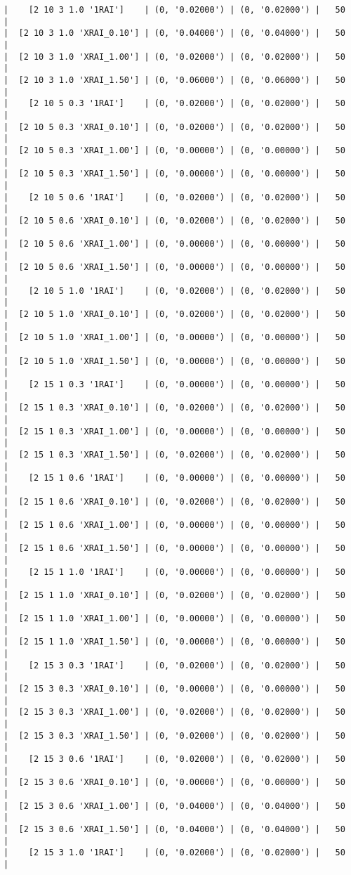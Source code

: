 \documentclass{article}
\begin{document}
\begin{verbatim}
|    [2 10 3 1.0 '1RAI']    | (0, '0.02000') | (0, '0.02000') |   50  |
|  [2 10 3 1.0 'XRAI_0.10'] | (0, '0.04000') | (0, '0.04000') |   50  |
|  [2 10 3 1.0 'XRAI_1.00'] | (0, '0.02000') | (0, '0.02000') |   50  |
|  [2 10 3 1.0 'XRAI_1.50'] | (0, '0.06000') | (0, '0.06000') |   50  |
|    [2 10 5 0.3 '1RAI']    | (0, '0.02000') | (0, '0.02000') |   50  |
|  [2 10 5 0.3 'XRAI_0.10'] | (0, '0.02000') | (0, '0.02000') |   50  |
|  [2 10 5 0.3 'XRAI_1.00'] | (0, '0.00000') | (0, '0.00000') |   50  |
|  [2 10 5 0.3 'XRAI_1.50'] | (0, '0.00000') | (0, '0.00000') |   50  |
|    [2 10 5 0.6 '1RAI']    | (0, '0.02000') | (0, '0.02000') |   50  |
|  [2 10 5 0.6 'XRAI_0.10'] | (0, '0.02000') | (0, '0.02000') |   50  |
|  [2 10 5 0.6 'XRAI_1.00'] | (0, '0.00000') | (0, '0.00000') |   50  |
|  [2 10 5 0.6 'XRAI_1.50'] | (0, '0.00000') | (0, '0.00000') |   50  |
|    [2 10 5 1.0 '1RAI']    | (0, '0.02000') | (0, '0.02000') |   50  |
|  [2 10 5 1.0 'XRAI_0.10'] | (0, '0.02000') | (0, '0.02000') |   50  |
|  [2 10 5 1.0 'XRAI_1.00'] | (0, '0.00000') | (0, '0.00000') |   50  |
|  [2 10 5 1.0 'XRAI_1.50'] | (0, '0.00000') | (0, '0.00000') |   50  |
|    [2 15 1 0.3 '1RAI']    | (0, '0.00000') | (0, '0.00000') |   50  |
|  [2 15 1 0.3 'XRAI_0.10'] | (0, '0.02000') | (0, '0.02000') |   50  |
|  [2 15 1 0.3 'XRAI_1.00'] | (0, '0.00000') | (0, '0.00000') |   50  |
|  [2 15 1 0.3 'XRAI_1.50'] | (0, '0.02000') | (0, '0.02000') |   50  |
|    [2 15 1 0.6 '1RAI']    | (0, '0.00000') | (0, '0.00000') |   50  |
|  [2 15 1 0.6 'XRAI_0.10'] | (0, '0.02000') | (0, '0.02000') |   50  |
|  [2 15 1 0.6 'XRAI_1.00'] | (0, '0.00000') | (0, '0.00000') |   50  |
|  [2 15 1 0.6 'XRAI_1.50'] | (0, '0.00000') | (0, '0.00000') |   50  |
|    [2 15 1 1.0 '1RAI']    | (0, '0.00000') | (0, '0.00000') |   50  |
|  [2 15 1 1.0 'XRAI_0.10'] | (0, '0.02000') | (0, '0.02000') |   50  |
|  [2 15 1 1.0 'XRAI_1.00'] | (0, '0.00000') | (0, '0.00000') |   50  |
|  [2 15 1 1.0 'XRAI_1.50'] | (0, '0.00000') | (0, '0.00000') |   50  |
|    [2 15 3 0.3 '1RAI']    | (0, '0.02000') | (0, '0.02000') |   50  |
|  [2 15 3 0.3 'XRAI_0.10'] | (0, '0.00000') | (0, '0.00000') |   50  |
|  [2 15 3 0.3 'XRAI_1.00'] | (0, '0.02000') | (0, '0.02000') |   50  |
|  [2 15 3 0.3 'XRAI_1.50'] | (0, '0.02000') | (0, '0.02000') |   50  |
|    [2 15 3 0.6 '1RAI']    | (0, '0.02000') | (0, '0.02000') |   50  |
|  [2 15 3 0.6 'XRAI_0.10'] | (0, '0.00000') | (0, '0.00000') |   50  |
|  [2 15 3 0.6 'XRAI_1.00'] | (0, '0.04000') | (0, '0.04000') |   50  |
|  [2 15 3 0.6 'XRAI_1.50'] | (0, '0.04000') | (0, '0.04000') |   50  |
|    [2 15 3 1.0 '1RAI']    | (0, '0.02000') | (0, '0.02000') |   50  |

\end{verbatim}
\end{document}

